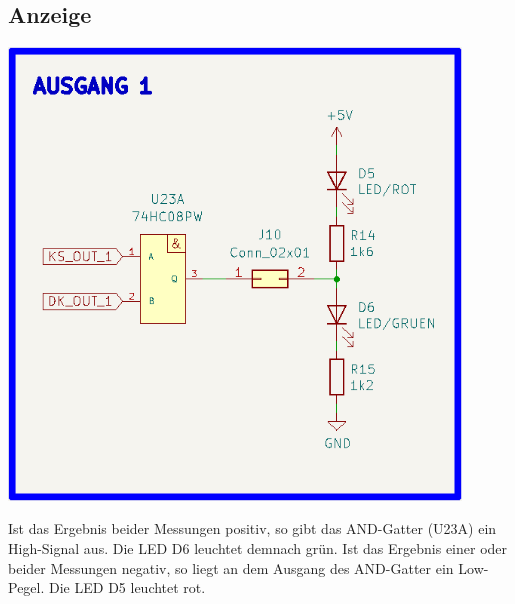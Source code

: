 \newpage
\subsection{Anzeige}

\begin{center}
\includegraphics[width=12cm]{Bilder/Anzeige.png}
\end{center}

\textcolor{rot}{Ist das Ergebnis beider Messungen positiv, so gibt das AND-Gatter (U23A) ein High-Signal aus. Die LED D6 leuchtet demnach grün. 
Ist das Ergebnis einer oder beider Messungen negativ, so liegt an dem Ausgang des AND-Gatter ein Low-Pegel. Die LED D5 leuchtet rot.}

